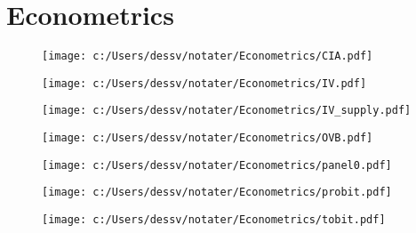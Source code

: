 \chapter{Econometrics} 
\begin{figure} 
\texttt{[image: c:/Users/dessv/notater/Econometrics/CIA.pdf]} 
\end{figure} 
\begin{figure} 
\texttt{[image: c:/Users/dessv/notater/Econometrics/IV.pdf]} 
\end{figure} 
\begin{figure} 
\texttt{[image: c:/Users/dessv/notater/Econometrics/IV\_supply.pdf]} 
\end{figure} 
\begin{figure} 
\texttt{[image: c:/Users/dessv/notater/Econometrics/OVB.pdf]} 
\end{figure} 
\begin{figure} 
\texttt{[image: c:/Users/dessv/notater/Econometrics/panel0.pdf]} 
\end{figure} 
\begin{figure} 
\texttt{[image: c:/Users/dessv/notater/Econometrics/probit.pdf]} 
\end{figure} 
\begin{figure} 
\texttt{[image: c:/Users/dessv/notater/Econometrics/tobit.pdf]} 
\end{figure} 

